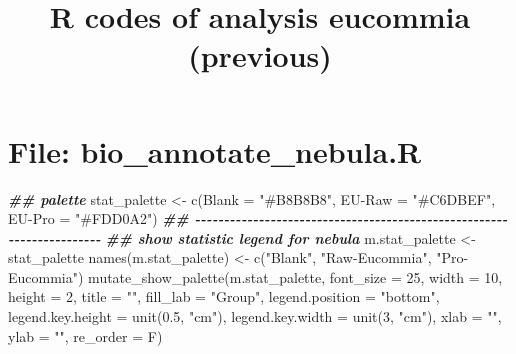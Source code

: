 \documentclass[
]{article}
\title{R codes of analysis eucommia (previous)}
\author{}
\date{\vspace{-2.5em}}
\newenvironment{Shaded}{\begin{snugshade}}{\end{snugshade}}
\newcommand{\AttributeTok}[1]{\textcolor[rgb]{0.77,0.63,0.00}{#1}}
\newcommand{\DecValTok}[1]{\textcolor[rgb]{0.00,0.00,0.81}{#1}}
\newcommand{\DocumentationTok}[1]{\textcolor[rgb]{0.56,0.35,0.01}{\textbf{\textit{#1}}}}
\newcommand{\FloatTok}[1]{\textcolor[rgb]{0.00,0.00,0.81}{#1}}
\newcommand{\FunctionTok}[1]{\textcolor[rgb]{0.00,0.00,0.00}{#1}}
\newcommand{\NormalTok}[1]{#1}
\newcommand{\OtherTok}[1]{\textcolor[rgb]{0.56,0.35,0.01}{#1}}
\newcommand{\StringTok}[1]{\textcolor[rgb]{0.31,0.60,0.02}{#1}}
\begin{document}
\maketitle

{
\setcounter{tocdepth}{3}
\tableofcontents
}
\hypertarget{file-bio_annotate_nebula.r}{%
\section{File: bio\_annotate\_nebula.R}\label{file-bio_annotate_nebula.r}}

\begin{Shaded}
\begin{Highlighting}[]
\DocumentationTok{\#\# palette}
\NormalTok{stat\_palette }\OtherTok{\textless{}{-}} \FunctionTok{c}\NormalTok{(}\AttributeTok{Blank =} \StringTok{"\#B8B8B8"}\NormalTok{,}
                  \StringTok{\textasciigrave{}}\AttributeTok{EU{-}Raw}\StringTok{\textasciigrave{}} \OtherTok{=} \StringTok{"\#C6DBEF"}\NormalTok{,}
                  \StringTok{\textasciigrave{}}\AttributeTok{EU{-}Pro}\StringTok{\textasciigrave{}} \OtherTok{=} \StringTok{"\#FDD0A2"}\NormalTok{)}
\DocumentationTok{\#\# {-}{-}{-}{-}{-}{-}{-}{-}{-}{-}{-}{-}{-}{-}{-}{-}{-}{-}{-}{-}{-}{-}{-}{-}{-}{-}{-}{-}{-}{-}{-}{-}{-}{-}{-}{-}{-}{-}{-}{-}{-}{-}{-}{-}{-}{-}{-}{-}{-}{-}{-}{-}{-}{-}{-}{-}{-}{-}{-}{-}{-}{-}{-}{-}{-}{-}{-}{-}{-}{-} }
\DocumentationTok{\#\# show statistic legend for nebula}
\NormalTok{m.stat\_palette }\OtherTok{\textless{}{-}}\NormalTok{ stat\_palette}
\FunctionTok{names}\NormalTok{(m.stat\_palette) }\OtherTok{\textless{}{-}} \FunctionTok{c}\NormalTok{(}\StringTok{"Blank"}\NormalTok{, }\StringTok{"Raw{-}Eucommia"}\NormalTok{, }\StringTok{"Pro{-}Eucommia"}\NormalTok{)}
\FunctionTok{mutate\_show\_palette}\NormalTok{(m.stat\_palette, }\AttributeTok{font\_size =} \DecValTok{25}\NormalTok{,}
             \AttributeTok{width =} \DecValTok{10}\NormalTok{,}
             \AttributeTok{height =} \DecValTok{2}\NormalTok{,}
             \AttributeTok{title =} \StringTok{""}\NormalTok{,}
             \AttributeTok{fill\_lab =} \StringTok{"Group"}\NormalTok{,}
             \AttributeTok{legend.position =} \StringTok{"bottom"}\NormalTok{,}
             \AttributeTok{legend.key.height =} \FunctionTok{unit}\NormalTok{(}\FloatTok{0.5}\NormalTok{, }\StringTok{"cm"}\NormalTok{),}
             \AttributeTok{legend.key.width =} \FunctionTok{unit}\NormalTok{(}\DecValTok{3}\NormalTok{, }\StringTok{"cm"}\NormalTok{),}
             \AttributeTok{xlab =} \StringTok{""}\NormalTok{, }\AttributeTok{ylab =} \StringTok{""}\NormalTok{, }\AttributeTok{re\_order =}\NormalTok{ F)}

\end{Highlighting}
\end{Shaded}
\end{document}

